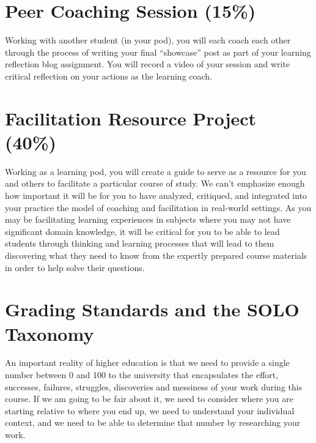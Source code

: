 \documentclass[
]{book}
\begin{document}
\hypertarget{peer-coaching-session-15}{%
\section*{Peer Coaching Session (15\%)}\label{peer-coaching-session-15}}

Working with another student (in your pod), you will each coach each other through the process of writing your final ``showcase'' post as part of your learning reflection blog assignment. You will record a video of your session and write critical reflection on your actions as the learning coach.

\hypertarget{facilitation-resource-project-40}{%
\section*{Facilitation Resource Project (40\%)}\label{facilitation-resource-project-40}}

Working as a learning pod, you will create a guide to serve as a resource for you and others to facilitate a particular course of study. We can't emphasize enough how important it will be for you to have analyzed, critiqued, and integrated into your practice the model of coaching and facilitation in real-world settings. As you may be facilitating learning experiences in subjects where you may not have significant domain knowledge, it will be critical for you to be able to lead students through thinking and learning processes that will lead to them discovering what they need to know from the expertly prepared course materials in order to help solve their questions.

\hypertarget{grading-standards-and-the-solo-taxonomy}{%
\section*{Grading Standards and the SOLO Taxonomy}\label{grading-standards-and-the-solo-taxonomy}}

An important reality of higher education is that we need to provide a single number between 0 and 100 to the university that encapsulates the effort, successes, failures, struggles, discoveries and messiness of your work during this course. If we am going to be fair about it, we need to consider where you are starting relative to where you end up, we need to understand your individual context, and we need to be able to determine that number by researching your work.
\end{document}
